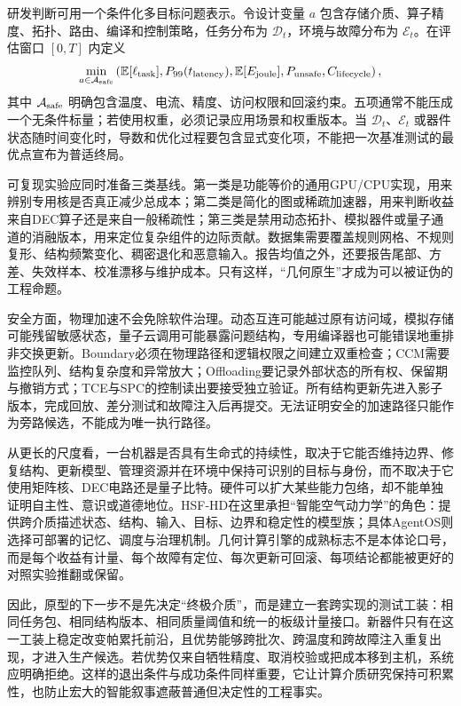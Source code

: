 研发判断可用一个条件化多目标问题表示。令设计变量 $a$ 包含存储介质、算子精度、拓扑、路由、编译和控制策略，任务分布为 $\mathcal D_t$，环境与故障分布为 $\mathcal E_t$。在评估窗口 $[0,T]$ 内定义
\[
\min_{a\in\mathcal A_{\rm safe}}
\left(
\mathbb E[\ell_{\rm task}],
P_{99}(t_{\rm latency}),
\mathbb E[E_{\rm joule}],
P_{\rm unsafe},
C_{\rm lifecycle}
\right),
\]
其中 $\mathcal A_{\rm safe}$ 明确包含温度、电流、精度、访问权限和回滚约束。五项通常不能压成一个无条件标量；若使用权重，必须记录应用场景和权重版本。当 $\mathcal D_t$、$\mathcal E_t$ 或器件状态随时间变化时，导数和优化过程要包含显式变化项，不能把一次基准测试的最优点宣布为普适终局。

可复现实验应同时准备三类基线。第一类是功能等价的通用GPU/CPU实现，用来辨别专用核是否真正减少总成本；第二类是简化的图或稀疏加速器，用来判断收益来自DEC算子还是来自一般稀疏性；第三类是禁用动态拓扑、模拟器件或量子通道的消融版本，用来定位复杂组件的边际贡献。数据集需要覆盖规则网格、不规则复形、结构频繁变化、稠密退化和恶意输入。报告均值之外，还要报告尾部、方差、失效样本、校准漂移与维护成本。只有这样，“几何原生”才成为可以被证伪的工程命题。

安全方面，物理加速不会免除软件治理。动态互连可能越过原有访问域，模拟存储可能残留敏感状态，量子云调用可能暴露问题结构，专用编译器也可能错误地重排非交换更新。Boundary必须在物理路径和逻辑权限之间建立双重检查；CCM需要监控队列、结构复杂度和异常放大；Offloading要记录外部状态的所有权、保留期与撤销方式；TCE与SPC的控制读出要接受独立验证。所有结构更新先进入影子版本，完成回放、差分测试和故障注入后再提交。无法证明安全的加速路径只能作为旁路候选，不能成为唯一执行路径。

从更长的尺度看，一台机器是否具有生命式的持续性，取决于它能否维持边界、修复结构、更新模型、管理资源并在环境中保持可识别的目标与身份，而不取决于它使用矩阵核、DEC电路还是量子比特。硬件可以扩大某些能力包络，却不能单独证明自主性、意识或道德地位。HSF-HD在这里承担“智能空气动力学”的角色：提供跨介质描述状态、结构、输入、目标、边界和稳定性的模型族；具体AgentOS则选择可部署的记忆、调度与治理机制。几何计算引擎的成熟标志不是本体论口号，而是每个收益有计量、每个故障有定位、每次更新可回滚、每项结论都能被更好的对照实验推翻或保留。

因此，原型的下一步不是先决定“终极介质”，而是建立一套跨实现的测试工装：相同任务包、相同结构版本、相同质量阈值和统一的板级计量接口。新器件只有在这一工装上稳定改变帕累托前沿，且优势能够跨批次、跨温度和跨故障注入重复出现，才进入生产候选。若优势仅来自牺牲精度、取消校验或把成本移到主机，系统应明确拒绝。这样的退出条件与成功条件同样重要，它让计算介质研究保持可积累性，也防止宏大的智能叙事遮蔽普通但决定性的工程事实。

